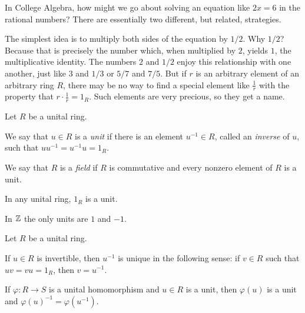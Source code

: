 In College Algebra, how might we go about solving an equation like \(2x = 6\) in the rational numbers? There are essentially two different, but related, strategies.

The simplest idea is to multiply both sides of the equation by \(1/2\). Why \(1/2\)? Because that is precisely the number which, when multiplied by \(2\), yields \(1\), the multiplicative identity. The numbers \(2\) and \(1/2\) enjoy this relationship with one another, just like \(3\) and \(1/3\) or \(5/7\) and \(7/5\). But if \(r\) is an arbitrary element of an arbitrary ring \(R\), there may be no way to find a special element like \(\frac{1}{r}\) with the property that \(r \cdot \frac{1}{r} = 1_R\). Such elements are very precious, so they get a name.

\begin{dfn}[Unit] \label{dfn:unit-field}
Let \(R\) be a unital ring.
\begin{proplist}
\item We say that \(u \in R\) is a \emph{unit} if there is an element \(u^{-1} \in R\), called an \emph{inverse} of \(u\), such that \(uu^{-1} = u^{-1}u = 1_R\). 
\item We say that \(R\) is a \emph{field} if \(R\) is commutative and every nonzero element of \(R\) is a unit. 
\end{proplist}
\end{dfn}

\begin{examples}
\item In any unital ring, \(1_R\) is a unit.

\item In \(\mathbb{Z}\) the only units are \(1\) and \(-1\).
\end{examples}

\begin{prop} \label{prop:unit-basics}
Let \(R\) be a unital ring.
\begin{proplist}
\item If \(u \in R\) is invertible, then \(u^{-1}\) is unique in the following sense: if \(v \in R\) such that \(uv = vu = 1_R\), then \(v = u^{-1}\). \label{prop:unit-basics:unique}
\item If \(\varphi : R \rightarrow S\) is a unital homomorphism and \(u \in R\) is a unit, then \(\varphi(u)\) is a unit and \(\varphi(u)^{-1} = \varphi(u^{-1})\).
\end{proplist}
\end{prop}

